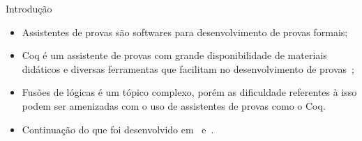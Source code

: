 \begin{frame}{Introdução}
    \begin{itemize}
        \item Assistentes de provas são softwares para desenvolvimento de provas formais;
        \item Coq é um assistente de provas com grande disponibilidade de materiais didáticos e diversas ferramentas que facilitam no desenvolvimento de provas~\cite{silva2019certificacao};
        \item Fusões de lógicas é um tópico complexo, porém as dificuldade referentes à isso podem ser amenizadas com o uso de assistentes de provas como o Coq.
        \item Continuação do que foi desenvolvido em~\cite{silveira2020implementacao} e~\cite{silveira2022sound}.
    \end{itemize}
\end{frame}